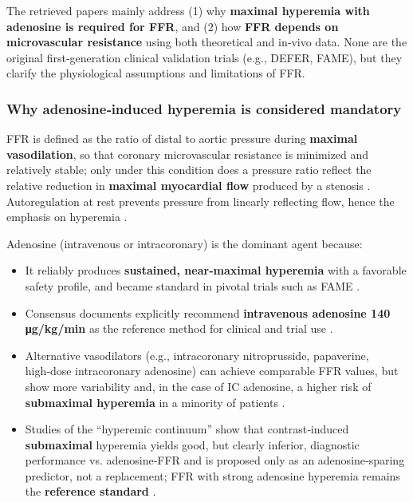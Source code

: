 The retrieved papers mainly address (1) why \textbf{maximal hyperemia with adenosine is required for FFR}, and (2) how \textbf{FFR depends on microvascular resistance} using both theoretical and in‑vivo data. None are the original first‑generation clinical validation trials (e.g., DEFER, FAME), but they clarify the physiological assumptions and limitations of FFR.


\subsubsection*{Why adenosine‑induced hyperemia is considered mandatory}


FFR is defined as the ratio of distal to aortic pressure during \textbf{maximal vasodilation}, so that coronary microvascular resistance is minimized and relatively stable; only under this condition does a pressure ratio reflect the relative reduction in \textbf{maximal myocardial flow} produced by a stenosis  \cite{Johnson2015Repeatability} \cite{Johnson2016Continuum}. Autoregulation at rest prevents pressure from linearly reflecting flow, hence the emphasis on hyperemia  \cite{Johnson2015Repeatability}.


Adenosine (intravenous or intracoronary) is the dominant agent because:


\begin{itemize}
\item It reliably produces \textbf{sustained, near‑maximal hyperemia} with a favorable safety profile, and became standard in pivotal trials such as FAME  \cite{Johnson2015Repeatability} \cite{Johnson2016Continuum}.
\item Consensus documents explicitly recommend \textbf{intravenous adenosine 140 μg/kg/min} as the reference method for clinical and trial use  \cite{Johnson2015Repeatability} \cite{Jeremias2000Adequacy} \cite{Johnson2016Continuum}.
\item Alternative vasodilators (e.g., intracoronary nitroprusside, papaverine, high‑dose intracoronary adenosine) can achieve comparable FFR values, but show more variability and, in the case of IC adenosine, a higher risk of \textbf{submaximal hyperemia} in a minority of patients  \cite{Leone2012Maximal} \cite{Jeremias2000Adequacy} \cite{Johnson2016Continuum} \cite{Verdoia2019Impact}.
\item Studies of the “hyperemic continuum” show that contrast‑induced \textbf{submaximal} hyperemia yields good, but clearly inferior, diagnostic performance vs. adenosine‑FFR and is proposed only as an adenosine‑sparing predictor, not a replacement; FFR with strong adenosine hyperemia remains the \textbf{reference standard}  \cite{Johnson2016Continuum}.
\end{itemize}



